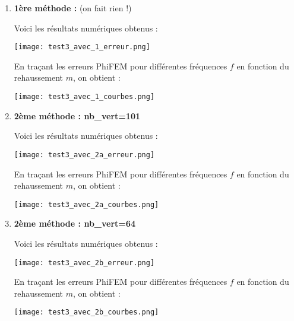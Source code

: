 \begin{enumerate}[label=\textbullet]
	\item \textbf{1ère méthode :} (on fait rien !)
	
	Voici les résultats numériques obtenus :
	
	\begin{minipage}{\linewidth}
		\centering
		\texttt{[image: test3\_avec\_1\_erreur.png]}
	\end{minipage}
	
	En traçant les erreurs PhiFEM pour différentes fréquences $f$ en fonction du rehaussement $m$, on obtient :
	
	\begin{minipage}{\linewidth}
		\centering
		\texttt{[image: test3\_avec\_1\_courbes.png]}
	\end{minipage}
	
	\newpage
	
	\item \textbf{2ème méthode : nb\_vert=101}
	
	Voici les résultats numériques obtenus :
	
	\begin{minipage}{\linewidth}
		\centering
		\texttt{[image: test3\_avec\_2a\_erreur.png]}
	\end{minipage}
	
	En traçant les erreurs PhiFEM pour différentes fréquences $f$ en fonction du rehaussement $m$, on obtient :
	
	\begin{minipage}{\linewidth}
		\centering
		\texttt{[image: test3\_avec\_2a\_courbes.png]}
	\end{minipage}
	
	\item \textbf{2ème méthode : nb\_vert=64}
	
	Voici les résultats numériques obtenus :
	
	\begin{minipage}{\linewidth}
		\centering
		\texttt{[image: test3\_avec\_2b\_erreur.png]}
	\end{minipage}
	
	En traçant les erreurs PhiFEM pour différentes fréquences $f$ en fonction du rehaussement $m$, on obtient :
	
	\begin{minipage}{\linewidth}
		\centering
		\texttt{[image: test3\_avec\_2b\_courbes.png]}
	\end{minipage}
	
\end{enumerate}
